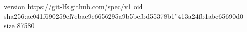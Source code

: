 version https://git-lfs.github.com/spec/v1
oid sha256:ac041f690259ef7ebac9e6656295a9b5befbd55378b17413a24fb1abc65690d0
size 87580
